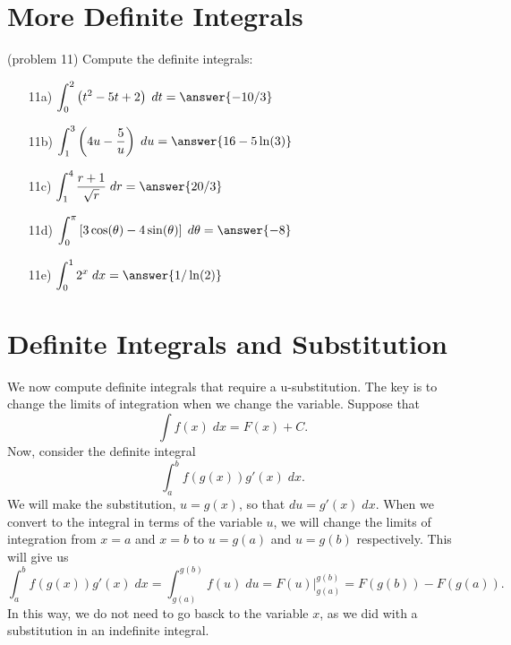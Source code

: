 \documentclass[handout]{ximera}
\begin{document}
\begin{center}
\begin{foldable}
\end{foldable}
\end{center}

\section{More Definite Integrals}


\begin{problem}(problem 11) Compute the definite integrals:
\begin{itemize}
\item[11a)] \; $\displaystyle{\int_0^2 \left(t^2 - 5t + 2\right) \; dt = \answer{-10/3}}$
\item[11b)] \; $\displaystyle{\int_1^ 3 \left(4u - \frac{5}{u}\right) \; du = \answer{16 - 5\ln(3)}}$
\item[11c)] \; $\displaystyle{\int_1^4 \frac{r + 1}{\sqrt r} \; dr = \answer{20/3}}$
\item[11d)] \; $\displaystyle{\int_0^\pi \left[3\cos(\theta) - 4\sin(\theta)\right] \; d\theta = \answer{-8}}$
\item[11e)] \; $\displaystyle{\int_0^1 2^x \; dx = \answer{1/\ln(2)}}$
\end{itemize}
\end{problem}



\section{Definite Integrals and Substitution}
We now compute definite integrals that require a u-substitution. The key is to change the limits of integration when we change the variable.
Suppose that
\[
\int f(x) \; dx = F(x) + C.
\]
Now, consider the definite integral
\[
\int_a^b f(g(x)) g'(x) \; dx.
\]
We will make the substitution, $u = g(x)$, so that $du = g'(x) \; dx$.
When we convert to the integral in terms of the variable $u$, we will change the limits of integration from $x = a$ and $x = b$ 
to $u = g(a)$ and $u = g(b)$ respectively. This will give us
\[\int_a^b f(g(x)) g'(x) \; dx = \int_{g(a)}^{g(b)} f(u) \; du = F(u)\bigg|_{g(a)}^{g(b)} = F(g(b)) - F(g(a)).\]
In this way, we do not need to go basck to the variable $x$, as we did with a substitution in an indefinite integral.
\end{document}
